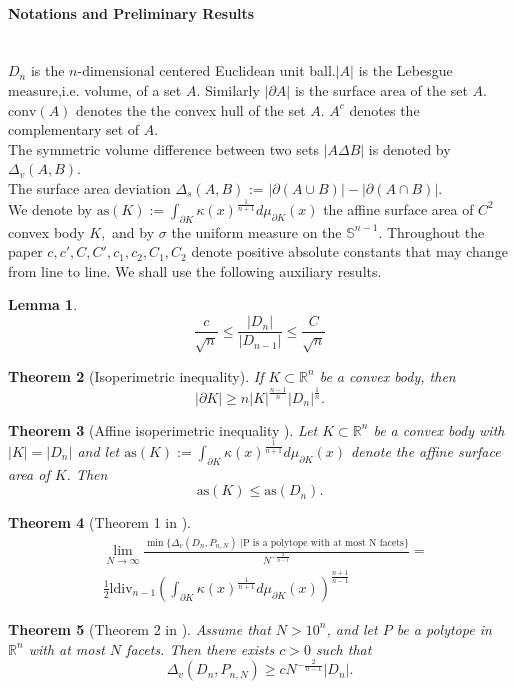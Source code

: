 \documentclass[10pt, twoside, leqno]{article}
\newtheorem{thm}{Theorem}[section]
\newtheorem{lemma}[thm]{Lemma}
\theoremstyle{definition}
\numberwithin{equation}{section}
\newcommand{\R}{\mathbb{R}}
\newcommand{\NN}{N^{-\frac 2{n-1} }}
\begin{document}
		\paragraph{Notations and Preliminary Results}\ \\
		$ D_n$ is the $n\textrm{-dimensional}$ centered  Euclidean unit ball.$ |A| $ is the Lebesgue measure,i.e. volume, of a set $A.$ Similarly $ |\partial A| $ is the surface area of the set $ A $. $ \text{conv}(A) $ denotes the the convex hull of the set $ A.$ $ A^c $ denotes the complementary set of $ A.$  \\
		The symmetric volume difference between two sets $ |A \Delta B|$ is denoted by $ \Delta_v(A,B) $.\\
		The surface area deviation $  \Delta_s \left(A,B\right)$ := $ |\partial\left(A\cup B\right)| - |\partial\left(A\cap B\right)| .$\\
		We denote by $ \text{as}(K) := \int_{\partial K} \kappa\left(x\right)^{\frac{1}{n+1}}d\mu_{\partial K}\left(x\right) $ the affine surface area of $ C^2 $ convex body $ K,$
		and by $\sigma$ the uniform measure on the $ \mathbb{S}^{n-1}.$
Throughout the paper $ c,c',C,C',c_1,c_2,C_1,C_2$  denote positive absolute constants that may change from
line to line.
We shall use the following auxiliary results.
\begin{lemma}
	\[
	\frac{c}{\sqrt{n}} \leq \frac{|D_n|}{|D_{n-1}|} \leq  \frac{C}{\sqrt{n}}
	\]
\end{lemma}
\begin{thm}[Isoperimetric inequality] {\label{isoperemetric}}
	If $ K \subset \R^n $ be a convex body, then %
	\[
		|\partial K| \geq n|K|^{\frac{n-1}{n}}|D_n|^{\frac{1}{n}}.
	\]   
\end{thm}
\begin{thm}[Affine isoperimetric inequality \cite{lutwak1996brunn}]{\label{affine}}
	Let $ K \subset \R^n $ be a convex body with  $ |K|=|D_n| $ and let $ \text{as}(K) := \int_{\partial K} \kappa\left(x\right)^{\frac{1}{n+1}}d\mu_{\partial K}\left(x\right) $ denote the affine surface area of $K$. Then
	\[
		\textrm{as}(K)\leq \textrm{as}(D_n). 	
	\]
\end{thm}
\begin{thm}[Theorem 1 in \cite{ludwig1999asymptotic}]\label{ludlemma}
	\begin{align*}
		&\lim_{N\to\infty}\frac{\min\{\Delta_v(D_n,P_{n,N})\;|\textrm{P is a polytope with at most N facets}\}}{\NN} =\\& \frac{1}{2}\textrm{ldiv}_{n-1}\left(\int_{\partial K} \kappa\left(x\right)^{\frac{1}{n+1}}d\mu_{\partial K}\left(x\right)\right)^{\frac{n+1}{n-1}}
	\end{align*}
\end{thm}
\begin{thm}[Theorem 2 in \cite{Lud06}]{\label{lowebound}}
	Assume that $ N>10^{n} $, and let $ P $ be a polytope in $\R^n$ with at most $ N $ facets. Then there exists $ c>0 $ such that
	\[
	 \Delta_v(D_n,P_{n,N}) \geq c\NN|D_n|.
	\]
\end{thm}
\end{document}
